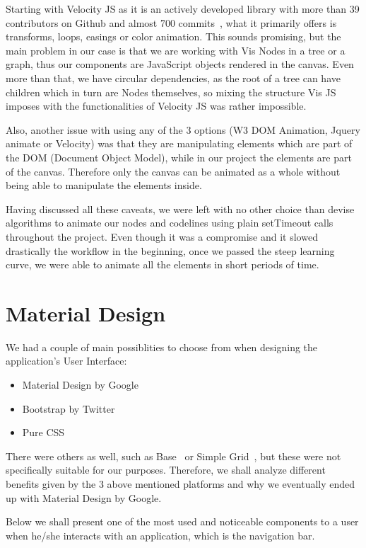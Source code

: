 \documentclass{l4proj}
\begin{document}
Starting with Velocity JS as it is an actively developed library with more than 39 contributors on Github and almost
700 commits~\cite{velocityjs}, what it primarily offers is transforms, loops, easings or color animation. This sounds
promising, but the main problem in our case is that we are working with Vis Nodes in a tree or a graph, thus our components
are JavaScript objects rendered in the canvas. Even more than that, we have circular dependencies, as the root of a tree can have children
which in turn are Nodes themselves, so mixing the structure Vis JS imposes with the functionalities of Velocity JS was
rather impossible.

Also, another issue with using any of the 3 options (W3 DOM Animation, Jquery animate or Velocity) was that they are
manipulating elements which are part of the DOM (Document Object Model), while in our project the elements are part of
the canvas. Therefore only the canvas can be animated as a whole without being able to manipulate the elements inside.

Having discussed all these caveats, we were left with no other choice than devise algorithms to animate our nodes and
codelines using plain setTimeout calls throughout the project. Even though it was a compromise and it slowed
drastically the workflow in the beginning, once we passed the steep learning curve, we were able to animate all the
elements in short periods of time.

\section{Material Design}

We had a couple of main possiblities to choose from when designing the application's User Interface:

\begin{itemize}
    \item Material Design by Google
    \item Bootstrap by Twitter
    \item Pure CSS
\end{itemize}

There were others as well, such as Base~\cite{base-ui} or Simple Grid~\cite{simple-grid-ui}, but these were not specifically suitable for
our purposes. Therefore, we shall analyze different benefits given by the 3 above mentioned platforms and why we
eventually ended up with Material Design by Google.

Below we shall present one of the most used and noticeable components to a user when he/she interacts with an
application, which is the navigation bar.
\end{document}
